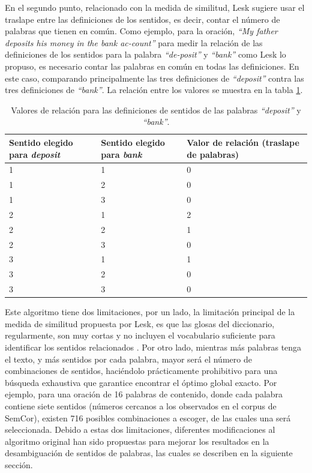 \clearpage
En el segundo punto, relacionado con la medida de similitud, Lesk sugiere usar el traslape entre las definiciones de los sentidos, es decir, contar el número de palabras que tienen en común. 
Como ejemplo, para la oración, \textit{“My father deposits his money in the bank ac-count”} para medir la relación de las definiciones de los sentidos para la palabra \textit{“de-posit”} y \textit{“bank”} como Lesk lo propuso, es necesario contar las palabras en común en todas las definiciones. En este caso, comparando principalmente las tres definiciones de \textit{“deposit”} contra las tres definiciones de \textit{“bank”}. La relación entre los valores se muestra en la tabla \ref{tab:sentidos_palabras}.

  \begin{table}[]
    \centering
      \begin{tabular}{|m{4cm}|m{4cm}|m{4cm}|}
      \hline
      Sentido elegido para \textit{deposit} & Sentido elegido para \textit{bank} & Valor de relación (traslape de palabras)\\
      \hline
      1 & 1 & 0 \\
      \hline
      1 & 2 & 0 \\
      \hline
      1 & 3 & 0 \\
      \hline
      2 & 1 & 2 \\
      \hline
      2 & 2 & 1 \\
      \hline
      2 & 3 & 0 \\
      \hline
      3 & 1 & 1 \\
      \hline
      3 & 2 & 0 \\
      \hline
      3 & 3 & 0 \\
      \hline
     \end{tabular}
   \caption{Valores de relación para las definiciones de sentidos de las palabras \textit{“deposit”} y \textit{“bank”}.\cite{001}}
   \label{tab:sentidos_palabras}
  \end{table}

Este algoritmo tiene dos limitaciones, por un lado, la limitación principal de la medida de similitud propuesta por Lesk, es que las glosas del diccionario, regularmente, son muy cortas y no incluyen el vocabulario suficiente para identificar los sentidos relacionados \cite{003}. Por otro lado, mientras más palabras tenga el texto, y más sentidos por cada palabra, mayor será el número de combinaciones de sentidos, haciéndolo prácticamente prohibitivo para una búsqueda exhaustiva que garantice encontrar el óptimo global exacto. Por ejemplo, para una oración de 16 palabras de contenido, donde cada palabra contiene siete sentidos (números cercanos a los observados en el corpus de SemCor), existen 716 posibles combinaciones a escoger, de las cuales una será seleccionada. 
Debido a estas dos limitaciones, diferentes modificaciones al algoritmo original han sido propuestas para mejorar los resultados en la desambiguación de sentidos de palabras, las cuales se describen en la siguiente sección.

